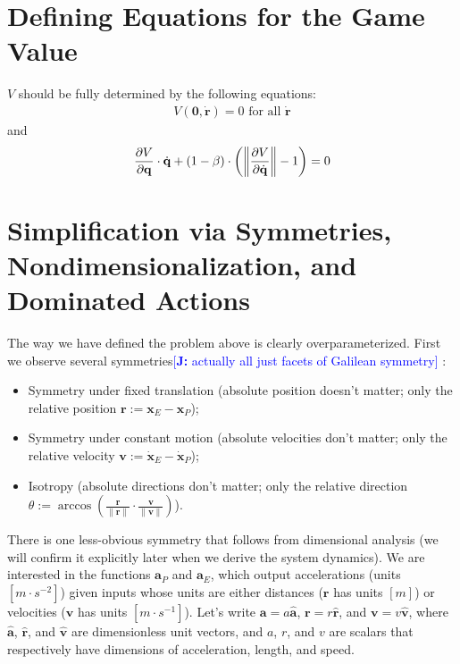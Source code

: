 \documentclass{article}
\newcommand{\authnote}[3]{\textcolor{#3}{[{\footnotesize {\bf #1:} { {#2}}}]}}
\newcommand{\jnote}[1]{\authnote{J}{#1}{blue} }
\newcommand{\eqdef}{:=}
\renewcommand{\vec}[1]{\mathbf{#1}}
\begin{document}
\section{Defining Equations for the Game Value}

$V$ should be fully determined by the following equations:
\begin{align*}
  V(\vec{0}, \dot{\vec{r}}) = 0  \text{ for all $\dot{\vec{r}}$}
\end{align*}
and
\[
  \frac{\partial V}{\partial \vec{q}} \cdot \dot{\vec{q}} + (1 - \beta) \cdot
  \left (\norm{\frac{\partial V}{\partial \dot{\vec{q}}}} - 1 \right) = 0
\]



\section{Simplification via Symmetries, Nondimensionalization, and Dominated Actions}
The way we have defined the problem above is clearly overparameterized.  First
we observe several symmetries\jnote{actually all just facets of Galilean symmetry}:
\begin{itemize}
\item Symmetry under fixed translation (absolute position doesn't matter; only the relative
  position $\vec{r} \eqdef \vec{x}_E - \vec{x}_P$);
\item Symmetry under constant motion (absolute velocities don't matter; only
  the relative velocity $\vec{v} \eqdef \dot{\vec{x}}_E - \dot{\vec{x}}_P$);
\item Isotropy (absolute directions don't matter; only the relative direction
  $\theta \eqdef \arccos(\frac{\vec{r}}{\| \vec{r} \|} \cdot \frac{\vec{v}}{\|
    \vec{v}\|})$).
\end{itemize}

There is one less-obvious symmetry that follows from dimensional analysis (we
will confirm it explicitly later when we derive the system dynamics).  We are
interested in the functions $\vec{a}_P$ and $\vec{a}_E$, which output
accelerations (units $[m \cdot s^{-2}]$) given inputs whose units are either
distances ($\vec{r}$ has units $[m]$) or velocities ($\vec{v}$ has units
$[m \cdot s^{-1}]$).  Let's write $\vec{a} = a \hat{\vec{a}}$,
$\vec{r} = r \hat{\vec{r}}$, and $\vec{v} = v \hat{\vec{v}}$, where $\hat{\vec{a}}$,
$\hat{\vec{r}}$, and $\hat{\vec{v}}$ are dimensionless unit vectors, and $a$, $r$, and $v$ are scalars that respectively have dimensions of
acceleration, length, and speed.
\end{document}

